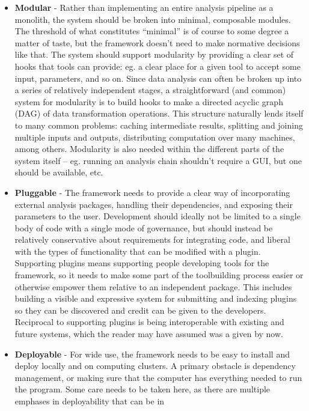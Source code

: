\documentclass[10pt]{article}
\begin{document}
\begin{multicols}{2}
\begin{itemize}
\item
  \textbf{Modular} - Rather than implementing an entire analysis
  pipeline as a monolith, the system should be broken into minimal,
  composable modules. The threshold of what constitutes ``minimal'' is
  of course to some degree a matter of taste, but the framework doesn't
  need to make normative decisions like that. The system should support
  modularity by providing a clear set of hooks that tools can provide:
  eg. a clear place for a given tool to accept some input, parameters,
  and so on. Since data analysis can often be broken up into a series of
  relatively independent stages, a straightforward (and common) system
  for modularity is to build hooks to make a directed acyclic graph
  (DAG) of data transformation operations. This structure naturally
  lends itself to many common problems: caching intermediate results,
  splitting and joining multiple inputs and outputs, distributing
  computation over many machines, among others. Modularity is also
  needed within the different parts of the system itself -- eg. running
  an analysis chain shouldn't require a GUI, but one should be
  available, etc.
\item
  \textbf{Pluggable} - The framework needs to provide a clear way of
  incorporating external analysis packages, handling their dependencies,
  and exposing their parameters to the user. Development should ideally
  not be limited to a single body of code with a single mode of
  governance, but should instead be relatively conservative about
  requirements for integrating code, and liberal with the types of
  functionality that can be modified with a plugin. Supporting plugins
  means supporting people developing tools for the framework, so it
  needs to make some part of the toolbuilding process easier or
  otherwise empower them relative to an independent package. This
  includes building a visible and expressive system for submitting and
  indexing plugins so they can be discovered and credit can be given to
  the developers. Reciprocal to supporting plugins is being
  interoperable with existing and future systems, which the reader may
  have assumed was a given by now.
\item
  \textbf{Deployable} - For wide use, the framework needs to be easy to
  install and deploy locally and on computing clusters. A primary
  obstacle is dependency management, or making sure that the computer
  has everything needed to run the program. Some care needs to be taken
  here, as there are multiple emphases in deployability that can be in

\end{itemize}
\end{multicols}
\end{document}
